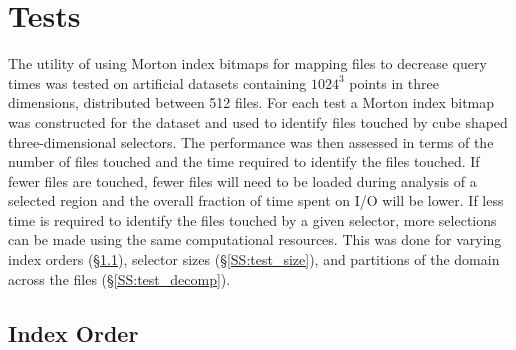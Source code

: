 \documentclass[apjl]{emulateapj}
\begin{document}
\section{Tests}\label{S:tests}
The utility of using Morton index bitmaps for mapping files to decrease query times was tested on artificial datasets containing $1024^3$ points in three dimensions, distributed between 512 files. For each test a Morton index bitmap was constructed for the dataset and used to identify files touched by cube shaped three-dimensional selectors. The performance was then assessed in terms of the number of files touched and the time required to identify the files touched. If fewer files are touched, fewer files will need to be loaded during analysis of a selected region and the overall fraction of time spent on I/O will be lower. If less time is required to identify the files touched by a given selector, more selections can be made using the same computational resources. This was done for varying index orders (\S\ref{SS:test_order}), selector sizes (\S\ref{SS:test_size}), and partitions of the domain across the files (\S\ref{SS:test_decomp}).

\subsection{Index Order}\label{SS:test_order}
\end{document}
